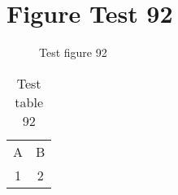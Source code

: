 \documentclass{article}
\begin{document}
\section{Figure Test 92}
\begin{figure}[h]
\caption{Test figure 92}
\end{figure}
\begin{table}[h]
\caption{Test table 92}
\begin{tabular}{cc}
A & B \\
1 & 2
\end{tabular}
\end{table}
\end{document}
